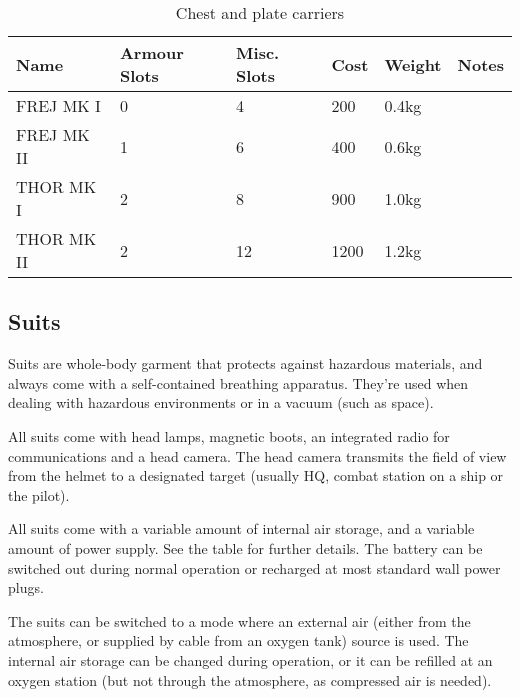 \begin{table}
  \caption{Chest and plate carriers}
  \label{tab:Carriers}
  \begin{center}
    \begin{tabular}{| l | l | l | l | l | l |}

      \hline
      \textbf{Name} & \textbf{Armour Slots} & \textbf{Misc. Slots} &
      \textbf{Cost} & \textbf{Weight} & \textbf{Notes} \\ \hline

      FREJ MK I   & 0 &  4 &  200 & 0.4kg & \\ \hline
      FREJ MK II  & 1 &  6 &  400 & 0.6kg & \\ \hline

      THOR MK I   & 2 &  8 &  900 & 1.0kg & \\ \hline
      THOR MK II  & 2 & 12 & 1200 & 1.2kg & \\ \hline

    \end{tabular}
  \end{center}
\end{table}

\subsection{Suits}
\label{sub:9-Suits}

Suits are whole-body garment that protects against hazardous materials, and
always come with a self-contained breathing apparatus. They're used when dealing
with hazardous environments or in a vacuum (such as space).

All suits come with head lamps, magnetic boots, an integrated radio for
communications and a head camera. The head camera transmits the field of view
from the helmet to a designated target (usually HQ, combat station on a ship or
the pilot).

All suits come with a variable amount of internal air storage, and a variable
amount of power supply. See the table for further details. The battery can be
switched out during normal operation or recharged at most standard wall power
plugs.

The suits can be switched to a mode where an external air (either from the
atmosphere, or supplied by cable from an oxygen tank) source is used.  The
internal air storage can be changed during operation, or it can be refilled at
an oxygen station (but not through the atmosphere, as compressed air is needed).

